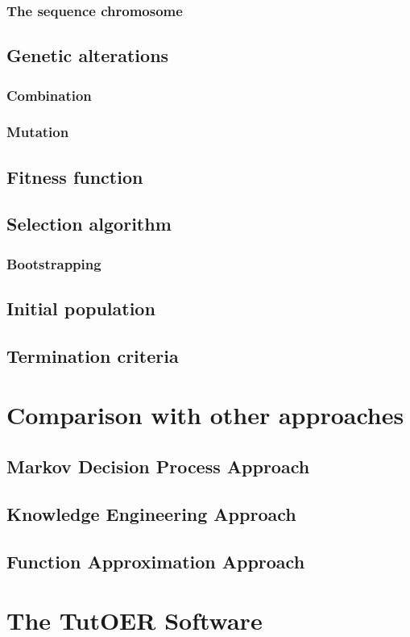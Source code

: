 \documentclass{book}
\begin{document}
\subsection{The sequence chromosome}
\section{Genetic alterations}
\subsection{Combination}
\subsection{Mutation}
\section{Fitness function}
\section{Selection algorithm}
\subsection{Bootstrapping}
\section{Initial population}
\section{Termination criteria}
\chapter{Comparison with other approaches}
\section{Markov Decision Process Approach}
\section{Knowledge Engineering Approach}
\section{Function Approximation Approach}
\chapter{The TutOER Software}
\end{document}
